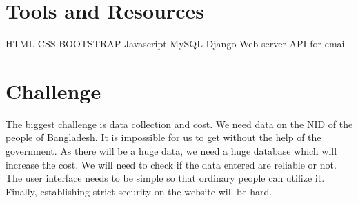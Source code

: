\documentclass[15pt]{article}
\begin{document}
\section*{Tools and Resources}
\raggedright
HTML \break
CSS \break
BOOTSTRAP \break
Javascript \break
MySQL \break
Django \break
Web server \break
API for email \break
    
\section*{Challenge}
The biggest challenge is data collection and cost. We need data on the NID of the people of Bangladesh. It is impossible for us to get without the help of the government. As there will be a huge data, we need a huge database which will increase the cost. We will need to check if the data entered are reliable or not. The user interface needs to be simple so that ordinary people can utilize it. Finally, establishing strict security on the website will be hard.
\end{document}
